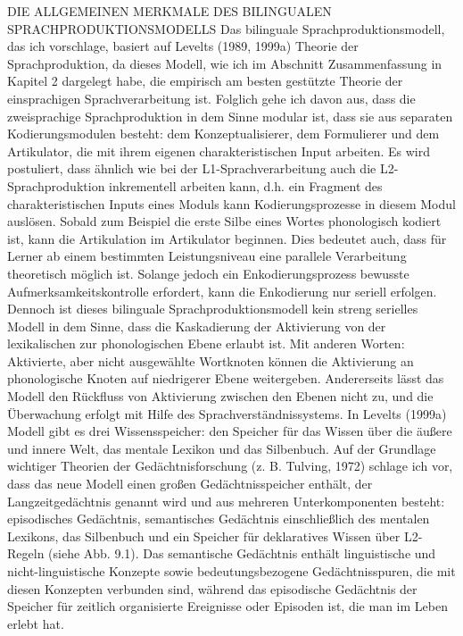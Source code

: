 \documentclass[
  letterpaper,
]{scrbook}
\begin{document}
DIE ALLGEMEINEN MERKMALE DES BILINGUALEN SPRACHPRODUKTIONSMODELLS Das
bilinguale Sprachproduktionsmodell, das ich vorschlage, basiert auf
Levelts (1989, 1999a) Theorie der Sprachproduktion, da dieses Modell,
wie ich im Abschnitt Zusammenfassung in Kapitel 2 dargelegt habe, die
empirisch am besten gestützte Theorie der einsprachigen
Sprachverarbeitung ist. Folglich gehe ich davon aus, dass die
zweisprachige Sprachproduktion in dem Sinne modular ist, dass sie aus
separaten Kodierungsmodulen besteht: dem Konzeptualisierer, dem
Formulierer und dem Artikulator, die mit ihrem eigenen
charakteristischen Input arbeiten. Es wird postuliert, dass ähnlich wie
bei der L1-Sprachverarbeitung auch die L2-Sprachproduktion inkrementell
arbeiten kann, d.h. ein Fragment des charakteristischen Inputs eines
Moduls kann Kodierungsprozesse in diesem Modul auslösen. Sobald zum
Beispiel die erste Silbe eines Wortes phonologisch kodiert ist, kann die
Artikulation im Artikulator beginnen. Dies bedeutet auch, dass für
Lerner ab einem bestimmten Leistungsniveau eine parallele Verarbeitung
theoretisch möglich ist. Solange jedoch ein Enkodierungsprozess bewusste
Aufmerksamkeitskontrolle erfordert, kann die Enkodierung nur seriell
erfolgen. Dennoch ist dieses bilinguale Sprachproduktionsmodell kein
streng serielles Modell in dem Sinne, dass die Kaskadierung der
Aktivierung von der lexikalischen zur phonologischen Ebene erlaubt ist.
Mit anderen Worten: Aktivierte, aber nicht ausgewählte Wortknoten können
die Aktivierung an phonologische Knoten auf niedrigerer Ebene
weitergeben. Andererseits lässt das Modell den Rückfluss von Aktivierung
zwischen den Ebenen nicht zu, und die Überwachung erfolgt mit Hilfe des
Sprachverständnissystems. In Levelts (1999a) Modell gibt es drei
Wissensspeicher: den Speicher für das Wissen über die äußere und innere
Welt, das mentale Lexikon und das Silbenbuch. Auf der Grundlage
wichtiger Theorien der Gedächtnisforschung (z. B. Tulving, 1972) schlage
ich vor, dass das neue Modell einen großen Gedächtnisspeicher enthält,
der Langzeitgedächtnis genannt wird und aus mehreren Unterkomponenten
besteht: episodisches Gedächtnis, semantisches Gedächtnis einschließlich
des mentalen Lexikons, das Silbenbuch und ein Speicher für deklaratives
Wissen über L2-Regeln (siehe Abb. 9.1). Das semantische Gedächtnis
enthält linguistische und nicht-linguistische Konzepte sowie
bedeutungsbezogene Gedächtnisspuren, die mit diesen Konzepten verbunden
sind, während das episodische Gedächtnis der Speicher für zeitlich
organisierte Ereignisse oder Episoden ist, die man im Leben erlebt hat.
\end{document}
